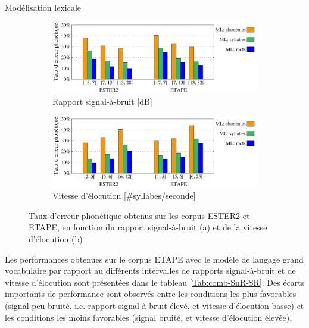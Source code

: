 \documentclass{style/these}
\begin{document}
\begin{part}{Modélisation lexicale}
\begin{figure}[h!]
\begin{subfigure}{\textwidth}
\centering
\includegraphics[scale=0.69]{images/results/wPER-SnR-3LM.pdf}
\caption{Rapport signal-à-bruit {[}dB{]}}
\end{subfigure}
\begin{subfigure}{\textwidth}
\centering
\includegraphics[scale=0.69]{images/results/wPER-SR-3LM.pdf} 
\caption{Vitesse d'élocution {[}\#syllabes/seconde{]}}
\end{subfigure}
\caption{Taux d'erreur phonétique obtenus sur les corpus ESTER2 et ETAPE, en fonction du rapport signal-à-bruit (a) et de la vitesse d'élocution (b)}
\label{Fig:SNR-SR}
\end{figure}

Les performances obtenues sur le corpus ETAPE avec le modèle de langage grand vocabulaire par rapport au différents intervalles de rapports signal-à-bruit et de vitesse d'élocution sont présentées dans le tableau \ref{Tab:comb-SnR-SR}. 
Des écarts importants de performance sont observés entre les conditions les plus favorables (signal peu bruité, i.e. rapport signal-à-bruit élevé, et vitesse d'élocution basse) et les conditions les moins favorables (signal bruité, et vitesse d'élocution élevée). 


\end{part}
\end{document}
